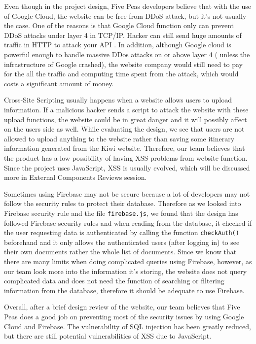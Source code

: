 \documentclass[12pt, a4paper]{article}
\newcommand{\code}[1]{\texttt{#1}}
\begin{document}
Even though in the project design, Five Peas developers believe that with the use of Google Cloud, the website can be free from DDoS attack, but it's not usually the case. One of the reasons is that Google Cloud function only can prevent DDoS attacks under layer 4 in TCP/IP. Hacker can still send huge amounts of traffic in HTTP to attack your API \cite{Google-DDoS}. In addition, although Google cloud is powerful enough to handle massive DDos attacks on or above layer 4 ( unless the infrastructure of Google crashed), the website company would still need to pay for the all the traffic and computing time spent from the attack, which would costs a significant amount of money.

Cross-Site Scripting usually happens when a website allows users to upload information. If a malicious hacker sends a script to attack the website with these upload functions, the website could be in great danger and it will possibly affect on the users side as well.
While evaluating the design, we see that users are not allowed to upload anything to the website rather than saving some itinerary information generated from the Kiwi website. Therefore, our team believes that the product has a low possibility of having XSS problems from website function. Since the project uses JavaScript, XSS is usually evolved, which will be discussed more in External Components Reviews session.

Sometimes using Firebase may not be secure because a lot of developers may not follow the security rules to protect their database. Therefore as we looked into Firebase security rule \cite{firebase} and the file \code{firebase.js}, we found that the design has followed Firebase security rules and when reading from the database, it checked if the user requesting data is authenticated by calling the function \code{checkAuth()} beforehand and it only allows the authenticated users (after logging in) to see their own documents rather the whole list of documents. Since we know that there are many limits when doing complicated queries using Firebase, however, as our team look more into the information it’s storing, the website does not query complicated data and does not need the function of searching or filtering information from the database, therefore it should be adequate to use Firebase.

Overall, after a brief design review of the website, our team believes that Five Peas does a good job on preventing most of the security issues by using Google Cloud and Firebase. The vulnerability of SQL injection has been greatly reduced, but there are still potential vulnerabilities of XSS due to JavaScript.
\end{document}
